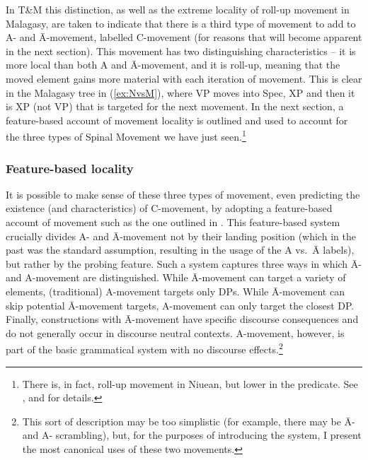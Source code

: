 \documentclass[output=paper,colorlinks,citecolor=brown,
]{langscibook}
\begin{document}
In T\&M this distinction, as well as the extreme locality of roll-up movement in Malagasy, are taken to indicate that there is a third type of movement to add to A- and \=A-movement, labelled C-movement (for reasons that will become apparent in the next section).  This movement has two distinguishing characteristics -- it is more local than both A and \=A-movement, and it is roll-up, meaning that the moved element gains more material with each iteration of movement.  This is clear in the Malagasy tree in (\ref{ex:NvsM}), where VP moves into Spec, XP and then it is XP (not VP) that is targeted for the next movement.  In the next section, a feature-based account of movement locality  is outlined and used to account for the three types of Spinal Movement we have just seen.\footnote{There is, in fact, roll-up movement in Niuean, but lower in the predicate.  See \citet{Massam:2010,Massam:2020}, and \citet{Travis:2021} for details.}  

\subsubsection{Feature-based locality\label{sec:feature}}

It is possible to make sense of these three types of movement, even predicting the existence (and characteristics) of C-movement, by adopting a feature-based account of movement such as the one outlined in \citet{vanUrk:2015a}. This feature-based system crucially divides A- and \=A-movement not by their landing position (which in the past was the standard assumption, resulting in the usage of the A vs.\ \=A labels), but rather by the probing feature. Such a  system  captures three ways in which \=A- and A-movement are distinguished.  While \=A-movement can target a variety of elements, (traditional) A-movement targets only DPs.  While \=A-movement can skip potential \=A-movement targets, A-movement can only target the closest DP.  Finally, constructions with \=A-movement have specific discourse consequences and do not generally occur in discourse neutral contexts.  A-movement, however, is part of the basic grammatical system with no discourse effects.\footnote{This sort of description may be too simplistic (for example, there may be \=A- and A- scrambling), but, for the purposes of introducing the system, I present the most canonical uses of these two movements.}  
\end{document}
